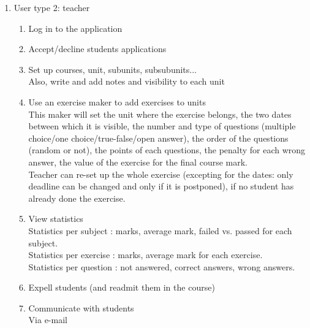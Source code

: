 \documentclass{article}
\begin{document}
\begin{enumerate}
\begin{enumerate}
\begin{enumerate}
\begin{enumerate}
			\end{enumerate}
			\item User type 2: teacher
			\begin{enumerate}
				\item Log in to the application\\
				
				\item Accept/decline students applications\\
				\item Set up courses, unit, subunits, subsubunits...\\
				Also, write and add  notes and visibility to each unit \\
				\item Use an exercise maker to add exercises to units\\
				This maker will set the unit where the exercise belongs, the two dates between which it is visible, the number and type of questions (multiple choice/one choice/true-false/open answer), the order of the questions (random or not), the points of each questions, the penalty for each wrong answer, the value of the exercise for the final course mark. \\
				Teacher can re-set up the whole exercise (excepting for the dates: only deadline can be changed and only if it is postponed), if no student has already done the exercise.\\
				\item View statistics\\
				Statistics per subject : marks, average mark, failed vs. passed for each subject.\\
				Statistics per exercise : marks, average mark for each exercise.\\
				Statistics per question : not answered, correct answers, wrong answers.\\
				\item Expell students (and readmit them in the course)\\
				\item Communicate with students\\
				Via e-mail\\
				

\end{enumerate}
\end{enumerate}
\end{enumerate}
\end{enumerate}
\end{document}
